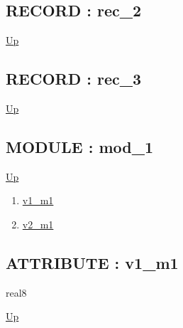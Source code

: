\subsection*{RECORD : rec\_2}
\hypertarget{ecldoc:example_2.rec_2}{}
\par
\begin{minipage}[t]{\textwidth}
\begin{flushleft}
  
\end{flushleft}
\end{minipage}
\hyperlink{ecldoc:example_2}{Up} \\
\par
\par
\subsection*{RECORD : rec\_3}
\hypertarget{ecldoc:example_2.rec_3}{}
\par
\begin{minipage}[t]{\textwidth}
\begin{flushleft}
  
\end{flushleft}
\end{minipage}
\hyperlink{ecldoc:example_2}{Up} \\
\par
\par
\subsection*{MODULE : mod\_1}
\hypertarget{ecldoc:example_2.mod_1}{}
\par
\begin{minipage}[t]{\textwidth}
\begin{flushleft}
  
\end{flushleft}
\end{minipage}
\hyperlink{ecldoc:example_2}{Up} \\
\par
\par
\begin{enumerate}
\item \hyperlink{ecldoc:example_2.mod_1.v1_m1}{v1\_m1}
\item \hyperlink{ecldoc:example_2.mod_1.v2_m1}{v2\_m1}
\end{enumerate}
\subsection*{ATTRIBUTE : v1\_m1}
\hypertarget{ecldoc:example_2.mod_1.v1_m1}{}
\par
\begin{minipage}[t]{\textwidth}
\begin{flushleft}
real8  
\end{flushleft}
\end{minipage}
\hyperlink{ecldoc:example_2.mod_1}{Up} \\
\par
\par
